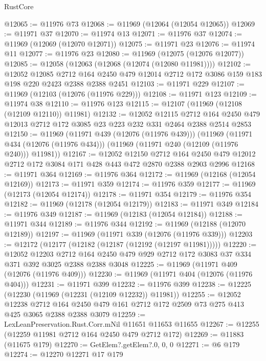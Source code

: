 \begin{lexlean}{RustCore}
\begin{coremodule}
@12065 := @11976 @73
@12068 := @11969 (@12064 (@12054 @12065))
@12069 := @11971 @37
@12070 := @11974 @13
@12071 := @11976 @37
@12074 := @11969 (@12069 (@12070 @12071))
@12075 := @11971 @23
@12076 := @11974 @11
@12077 := @11976 @23
@12080 := @11969 (@12075 (@12076 @12077))
@12085 := @12058 (@12063 (@12068 (@12074 (@12080 @11981))))
@12102 := @12052
    @12085
    @2712
    @164
    @2450
    @479
    @12014
    @2712
    @172
    @3086
    @159
    @183
    @198
    @220
    @2423
    @2388
    @2388
    @2451
@12103 := @11971 @229
@12107 := @11969 (@12103 (@12076 (@11976 @229)))
@12108 := @11971 @123
@12109 := @11974 @38
@12110 := @11976 @123
@12115 := @12107 (@11969 (@12108 (@12109 @12110)) @11981)
@12132 := @12052
    @12115
    @2712
    @164
    @2450
    @479
    @12013
    @2712
    @172
    @3085
    @23
    @223
    @232
    @331
    @2464
    @2388
    @2514
    @2853
@12150 := @11969
    (@11971 @439 (@12076 (@11976 @439)))
    (@11969
      (@11971 @434 (@12076 (@11976 @434)))
      (@11969 (@11971 @240 (@12109 (@11976 @240))) @11981))
@12167 := @12052
    @12150
    @2712
    @164
    @2450
    @479
    @12012
    @2712
    @172
    @3084
    @171
    @428
    @443
    @472
    @2870
    @2388
    @2903
    @2996
@12168 := @11971 @364
@12169 := @11976 @364
@12172 := @11969 (@12168 (@12054 @12169))
@12173 := @11971 @359
@12174 := @11976 @359
@12177 := @11969 (@12173 (@12054 @12174))
@12178 := @11971 @354
@12179 := @11976 @354
@12182 := @11969 (@12178 (@12054 @12179))
@12183 := @11971 @349
@12184 := @11976 @349
@12187 := @11969 (@12183 (@12054 @12184))
@12188 := @11971 @344
@12189 := @11976 @344
@12192 := @11969 (@12188 (@12070 @12189))
@12197 := @11969 (@11971 @339 (@12076 (@11976 @339)))
@12203 := @12172 (@12177 (@12182 (@12187 (@12192 (@12197 @11981)))))
@12220 := @12052
    @12203
    @2712
    @164
    @2450
    @479
    @929
    @2712
    @172
    @3083
    @37
    @334
    @371
    @392
    @3025
    @2388
    @2388
    @3048
@12225 := @11969 (@11971 @409 (@12076 (@11976 @409)))
@12230 := @11969 (@11971 @404 (@12076 (@11976 @404)))
@12231 := @11971 @399
@12232 := @11976 @399
@12238 := @12225 (@12230 (@11969 (@12231 (@12109 @12232)) @11981))
@12255 := @12052
    @12238
    @2712
    @164
    @2450
    @479
    @161
    @2712
    @172
    @2509
    @73
    @275
    @413
    @425
    @3065
    @2388
    @2388
    @3079
@12259 := LexLeanPreservation.Rust.Corr.mNil @11651 @11653 @11655
@12267 := @12255 (@12259 @11981 @2712 @164 @2450 @479 @2712 @172)
@12269 := @11883 (@11675 @179)
@12270 := GetElem?.getElem?.{0, 0, 0}
@12271 := @6 @179
@12274 := @12270 @12271 @17 @179

\end{coremodule}
\end{lexlean}
